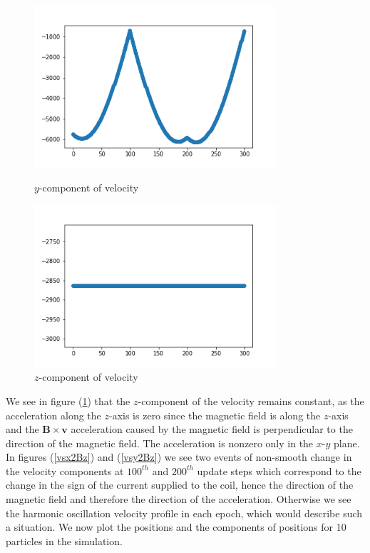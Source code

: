 \documentclass[12pt]{article}
\begin{document}
	\begin{figure}[H]
		\begin{multicols}{2}
			\includegraphics[width=\linewidth, height=6cm]{vsy2Bz.png} \caption{$y$-component of velocity} \label{vsy2Bz} \par
			\includegraphics[width=\linewidth, height=6cm]{vsz2Bz.png} \caption{$z$-component of velocity} \label{vsz2Bz} \par
		\end{multicols}
	\end{figure}
	\noindent We see in figure (\ref{vsz2Bz}) that the $z$-component of the velocity remains constant, as the acceleration along the $z$-axis is zero since the magnetic field is along the $z$-axis and the $\mathbf{B} \times \boldsymbol{v}$ acceleration caused by the magnetic field is perpendicular to the direction of the magnetic field. The acceleration is nonzero only in the $x$-$y$ plane. In figures (\ref{vsx2Bz}) and (\ref{vsy2Bz}) we see two events of non-smooth change in the velocity components at $100^{th}$ and $200^{th}$ update steps which correspond to the change in the sign of the current supplied to the coil, hence the direction of the magnetic field and therefore the direction of the acceleration. Otherwise we see the harmonic oscillation velocity profile in each epoch, which would describe such a situation. We now plot the positions and the components of positions for 10 particles in the simulation.
\end{document}
